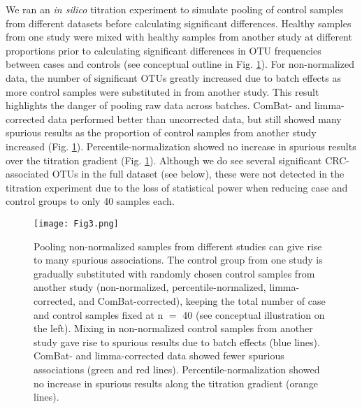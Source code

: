 We ran an \textit{in silico} titration experiment to simulate pooling of control samples from different datasets before calculating significant differences.
Healthy samples from one study were mixed with healthy samples from another study at different proportions prior to calculating significant differences in OTU frequencies between cases and controls (see conceptual outline in Fig. \ref{percnorm:fig3}).
For non-normalized data, the number of significant OTUs greatly increased due to batch effects as more control samples were substituted in from another study.
This result highlights the danger of pooling raw data across batches. ComBat- and limma-corrected data performed better than uncorrected data, but still showed many spurious results as the proportion of control samples from another study increased (Fig. \ref{percnorm:fig3}).
Percentile-normalization showed no increase in spurious results over the titration gradient (Fig. \ref{percnorm:fig3}).
Although we do see several significant CRC-associated OTUs in the full dataset (see below), these were not detected in the titration experiment due to the loss of statistical power when reducing case and control groups to only 40 samples each.

\begin{figure}[h]
\begin{center}
    \texttt{[image: Fig3.png]}
    \caption{Pooling non-normalized samples from different studies can give rise to many spurious associations. The control group from one study is gradually substituted with randomly chosen control samples from another study (non-normalized, percentile-normalized, limma-corrected, and ComBat-corrected), keeping the total number of case and control samples fixed at n $=$ 40 (see conceptual illustration on the left). Mixing in non-normalized control samples from another study gave rise to spurious results due to batch effects (blue lines). ComBat- and limma-corrected data showed fewer spurious associations (green and red lines). Percentile-normalization showed no increase in spurious results along the titration gradient (orange lines).}\label{percnorm:fig3}
\end{center}
\end{figure}

